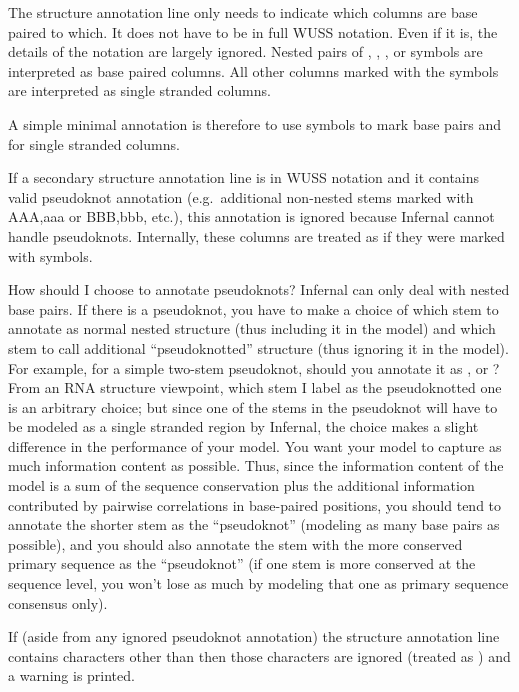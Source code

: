 The structure annotation line only needs to indicate which columns are
base paired to which. It does not have to be in full WUSS notation.
Even if it is, the details of the notation are largely ignored.
Nested pairs of \otext{<>}, \otext{()}, \otext{[]}, or \otext{{}} symbols
are interpreted as base paired columns. All other columns marked with
the symbols  are interpreted as single stranded columns.

A simple minimal annotation is therefore to use \otext{<>} symbols to
mark base pairs and  for single stranded columns.

If a secondary structure annotation line is in WUSS notation and it
contains valid pseudoknot annotation (e.g.\ additional non-nested
stems marked with AAA,aaa or BBB,bbb, etc.), this annotation is
ignored because Infernal cannot handle
pseudoknots. Internally, these columns are treated as if they were
marked with  symbols.

\begin{srefaq}{How should I choose to annotate pseudoknots?} 
Infernal can only deal with nested base pairs. If there is
a pseudoknot, you have to make a choice of which stem to annotate as
normal nested structure (thus including it in the model) and which
stem to call additional ``pseudoknotted'' structure (thus ignoring it
in the model). For example, for a simple two-stem pseudoknot, should
you annotate it as , or
?  From an RNA structure viewpoint, which
stem I label as the pseudoknotted one is an arbitrary choice; but
since one of the stems in the pseudoknot will have to be modeled as a
single stranded region by Infernal, the choice makes a
slight difference in the performance of your model. You want your
model to capture as much information content as possible.  Thus, since
the information content of the model is a sum of the sequence
conservation plus the additional information contributed by pairwise
correlations in base-paired positions, you should tend to annotate the
shorter stem as the ``pseudoknot'' (modeling as many base pairs as
possible), and you should also annotate the stem with the more
conserved primary sequence as the ``pseudoknot'' (if one stem is more
conserved at the sequence level, you won't lose as much by modeling
that one as primary sequence consensus only).
\end{srefaq}

If (aside from any ignored pseudoknot annotation) the structure
annotation line contains characters other than 
then those characters are ignored (treated as ) and a warning
is printed.


